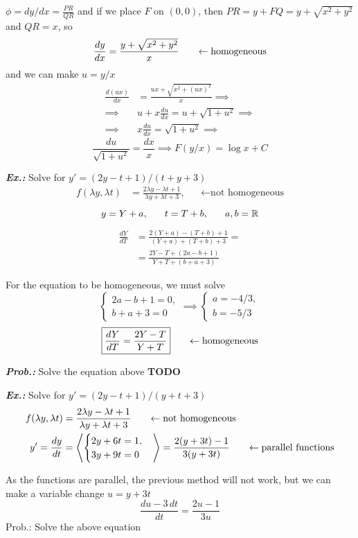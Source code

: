 \documentclass[a4paper]{article}
\begin{document}
$\phi=dy / dx=\frac{PR}{QR}$ and if we place $F$ on $(0,0)$, then $PR=y+FQ=y+\sqrt{ x^{2}+y^{2} }$ and $QR=x$, so
$$
\frac{dy}{dx}=\frac{y+\sqrt{ x^{2}+y^{2} }}{x}\hspace{4ex}\leftarrow\text{homogeneous}
$$
and we can make $u=y / x$
\begin{align}
\frac{d(ux)}{dx}&=\frac{ux+\sqrt{ x^{2}+(ux)^{2} }}{x}\implies \\
\implies&u+x \frac{du}{dx}=u+\sqrt{ 1+u^{2} }\implies \\
\implies&x \frac{du}{dx}=\sqrt{ 1+u^{2} } \implies
\end{align}
$$
\boxed{\frac{du}{\sqrt{ 1+u^{2} }}=\frac{dx}{x} \implies F(y / x)=\log x+C}
$$

\textit{\textbf{Ex.:}} Solve for $y'=(2y-t+1) / (t+y+3)$
\begin{align}
f(\lambda y,\lambda t)&=\frac{2\lambda y-\lambda t+1}{\lambda y+\lambda t+3}, & &\leftarrow\text{not homogeneous}
\end{align}
$$
y=Y+a,\hspace{4ex}t=T+b,\hspace{4ex}a,b=\mathbb{R}
$$
\begin{align}
\frac{dY}{dT}&=\frac{2(Y+a)-(T+b)+1}{(Y+a)+(T+b)+3}= \\
&= \frac{2Y-T+(2a-b+1)}{Y+T+(b+a+3)}
\end{align}

For the equation to be homogeneous, we must solve
$$
\begin{cases}
2a-b+1=0, \\
b+a+3=0
\end{cases}\implies \begin{cases}
a=-4 / 3, \\
b=-5 / 3
\end{cases}
$$
$$
\boxed{\frac{dY}{dT}=\frac{2Y-T}{Y+T}}\hspace{4ex}\leftarrow\text{homogeneous}
$$

\textit{\textbf{Prob.:}} Solve the equation above \textbf{TODO}

\textit{\textbf{Ex.:}} Solve for $y'=(2y-t+1) / (y+t+3)$
\begin{align}
f(\lambda y,\lambda t)&=\frac{2\lambda y-\lambda t+1}{\lambda y+\lambda t+3}\hspace{4ex}\leftarrow\text{not homogeneous} \\
y'=\frac{dy}{dt}&=\left\langle\begin{cases}
2y+6t=1, \\
3y+9t=0
\end{cases}\right\rangle =\frac{2(y+3t)-1}{3(y+3t)} \hspace{4ex}\leftarrow\text{parallel functions}
\end{align}

As the functions are parallel, the previous method will not work, but we can make a variable change $u=y+3t$
$$
\boxed{\frac{du-3\,dt}{dt}=\frac{2u-1}{3u}}
$$
Prob.: Solve the above equation
\end{document}
